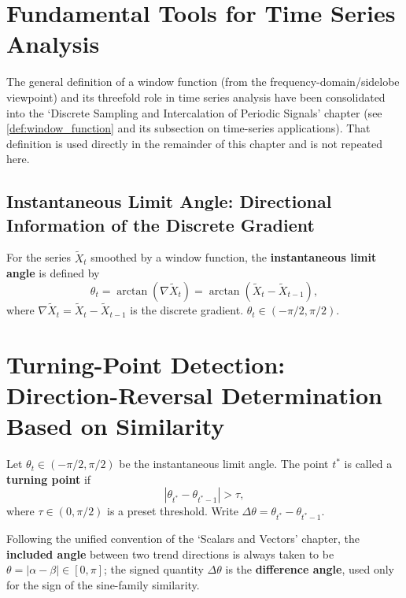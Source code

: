 \section{Fundamental Tools for Time Series Analysis}

\begin{remark}\label{rem:ts_window_function_merged}
The general definition of a window function (from the frequency-domain/sidelobe viewpoint) and its threefold role in time series analysis have been consolidated into the `Discrete Sampling and Intercalation of Periodic Signals' chapter (see \cref{def:window_function} and its subsection on time-series applications). That definition is used directly in the remainder of this chapter and is not repeated here.
\end{remark}

\subsection{Instantaneous Limit Angle: Directional Information of the Discrete Gradient}

\begin{definition}\label{def:ts_limit_angle}
For the series $\tilde{X}_t$ smoothed by a window function, the \textbf{instantaneous limit angle} is defined by
\[
\theta_t = \arctan(\nabla \tilde{X}_t) = \arctan(\tilde{X}_t - \tilde{X}_{t-1}),
\]
where $\nabla \tilde{X}_t = \tilde{X}_t - \tilde{X}_{t-1}$ is the discrete gradient. $\theta_t \in (-\pi/2, \pi/2)$.
\end{definition}

\section{Turning-Point Detection: Direction-Reversal Determination Based on Similarity}

\begin{definition}\label{def:ts_turning_point}
Let $\theta_t \in (-\pi/2, \pi/2)$ be the instantaneous limit angle. The point $t^*$ is called a \textbf{turning point} if
\[
|\theta_{t^*} - \theta_{t^*-1}| > \tau,
\]
where $\tau \in (0, \pi/2)$ is a preset threshold. Write $\Delta\theta = \theta_{t^*} - \theta_{t^*-1}$.

Following the unified convention of the `Scalars and Vectors' chapter, the \textbf{included angle} between two trend directions is always taken to be $\theta=\lvert\alpha-\beta\rvert\in[0,\pi]$; the signed quantity $\Delta\theta$ is the \textbf{difference angle}, used only for the sign of the sine-family similarity.
\end{definition}

